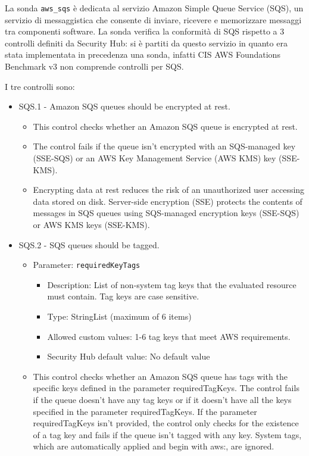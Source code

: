 La sonda \texttt{aws\_sqs} è dedicata al servizio Amazon Simple Queue Service (SQS), un servizio di messaggistica che consente di inviare, ricevere e memorizzare messaggi tra componenti software. La sonda verifica la conformità di SQS rispetto a 3 controlli definiti da Security Hub: si è partiti da questo servizio in quanto era stata implementata in precedenza una sonda, infatti CIS AWS Foundations Benchmark v3 non comprende controlli per SQS.

I tre controlli sono:
\begin{mdframed}[backgroundcolor=gray!05, linecolor=gray!50]
\itshape
    \begin{itemize}
    \item  SQS.1 - Amazon SQS queues should be encrypted at rest. 
    \begin{itemize}
        \item This control checks whether an Amazon SQS queue is encrypted at rest. 
        \item The control fails if the queue isn't encrypted with an SQS-managed key (SSE-SQS) or an AWS Key Management Service (AWS KMS) key (SSE-KMS).
        \item Encrypting data at rest reduces the risk of an unauthorized user accessing data stored on disk. Server-side encryption (SSE) protects the contents of messages in SQS queues using SQS-managed encryption keys (SSE-SQS) or AWS KMS keys (SSE-KMS).
    \end{itemize}
    \item SQS.2 - SQS queues should be tagged.
    \begin{itemize}
        \item Parameter: \texttt{requiredKeyTags}
        \begin{itemize}
        \item Description: List of non-system tag keys that the evaluated resource must contain. Tag keys are case sensitive.	
        \item Type: StringList (maximum of 6 items) 
        \item Allowed custom values: 1-6 tag keys that meet AWS requirements.
        \item Security Hub default value: No default value
        \end{itemize}
        \item This control checks whether an Amazon SQS queue has tags with the specific keys defined in the parameter requiredTagKeys. The control fails if the queue doesn't have any tag keys or if it doesn't have all the keys specified in the parameter requiredTagKeys. If the parameter requiredTagKeys isn't provided, the control only checks for the existence of a tag key and fails if the queue isn't tagged with any key. System tags, which are automatically applied and begin with aws:, are ignored. 

\end{itemize}
\end{itemize}
\end{mdframed}
